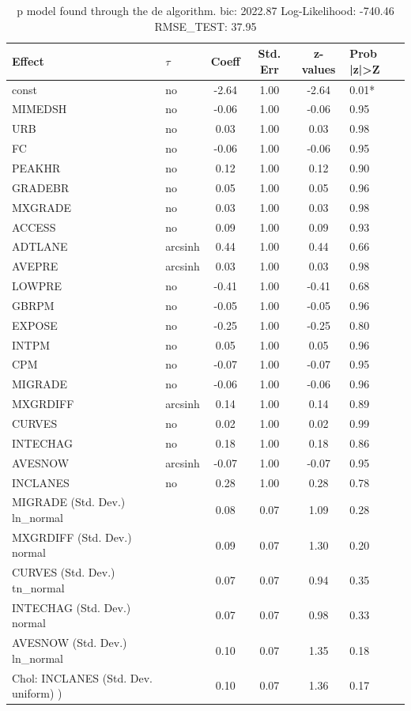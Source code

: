 \begin{table}
	\caption{p model found through the de algorithm. bic: 2022.87 Log-Likelihood: -740.46 RMSE_TEST: 37.95}
	\begin{center}
		\begin{tabular}{|l|l|c|c|c|l|}
			\hline
			Effect & $\tau$ & Coeff & Std. Err & z-values & Prob |z|>Z \\
			\hline
			const & no & -2.64 & 1.00 & -2.64 & 0.01* \\
			\hline
			MIMEDSH & no & -0.06 & 1.00 & -0.06 & 0.95 \\
			\hline
			URB & no & 0.03 & 1.00 & 0.03 & 0.98 \\
			\hline
			FC & no & -0.06 & 1.00 & -0.06 & 0.95 \\
			\hline
			PEAKHR & no & 0.12 & 1.00 & 0.12 & 0.90 \\
			\hline
			GRADEBR & no & 0.05 & 1.00 & 0.05 & 0.96 \\
			\hline
			MXGRADE & no & 0.03 & 1.00 & 0.03 & 0.98 \\
			\hline
			ACCESS & no & 0.09 & 1.00 & 0.09 & 0.93 \\
			\hline
			ADTLANE & arcsinh & 0.44 & 1.00 & 0.44 & 0.66 \\
			\hline
			AVEPRE & arcsinh & 0.03 & 1.00 & 0.03 & 0.98 \\
			\hline
			LOWPRE & no & -0.41 & 1.00 & -0.41 & 0.68 \\
			\hline
			GBRPM & no & -0.05 & 1.00 & -0.05 & 0.96 \\
			\hline
			EXPOSE & no & -0.25 & 1.00 & -0.25 & 0.80 \\
			\hline
			INTPM & no & 0.05 & 1.00 & 0.05 & 0.96 \\
			\hline
			CPM & no & -0.07 & 1.00 & -0.07 & 0.95 \\
			\hline
			MIGRADE & no & -0.06 & 1.00 & -0.06 & 0.96 \\
			\hline
			MXGRDIFF & arcsinh & 0.14 & 1.00 & 0.14 & 0.89 \\
			\hline
			CURVES & no & 0.02 & 1.00 & 0.02 & 0.99 \\
			\hline
			INTECHAG & no & 0.18 & 1.00 & 0.18 & 0.86 \\
			\hline
			AVESNOW & arcsinh & -0.07 & 1.00 & -0.07 & 0.95 \\
			\hline
			INCLANES & no & 0.28 & 1.00 & 0.28 & 0.78 \\
			\hline
			MIGRADE (Std. Dev.) ln_normal &  & 0.08 & 0.07 & 1.09 & 0.28 \\
			\hline
			MXGRDIFF (Std. Dev.) normal &  & 0.09 & 0.07 & 1.30 & 0.20 \\
			\hline
			CURVES (Std. Dev.) tn_normal &  & 0.07 & 0.07 & 0.94 & 0.35 \\
			\hline
			INTECHAG (Std. Dev.) normal &  & 0.07 & 0.07 & 0.98 & 0.33 \\
			\hline
			AVESNOW (Std. Dev.) ln_normal &  & 0.10 & 0.07 & 1.35 & 0.18 \\
			\hline
			 Chol: INCLANES (Std. Dev. uniform) ) &  & 0.10 & 0.07 & 1.36 & 0.17 \\
			\hline
		\end{tabular}
	\end{center}
\end{table}